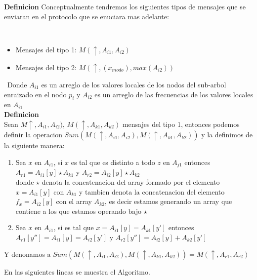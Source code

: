 \documentclass[11pt]{article}
\begin{document}
\textbf{Definicion}
Conceptualmente tendremos los siguientes tipos de mensajes que se enviaran en el protocolo que se enuciara
mas adelante:

\
\begin{itemize}
    \item Mensajes del tipo 1: $M(\uparrow, A_{i1},A_{i2}) $
    \item Mensajes del tipo 2: $ M(\uparrow,(x_{modo}), max(A_{i2}))$
\end{itemize}
\
Donde $A_{i1}$ es un arreglo de los valores locales de los nodos del sub-arbol enraizado
en el nodo $p_{i}$ y $A_{i2}$ es un arreglo de las frecuencias de los valores locales en $A_{i1}$
\\

\textbf{Definicion}\\
Sean $M\uparrow, A_{i1}, A_{i2})$, $M(\uparrow, A_{k1}, A_{k2})$ mensajes del tipo 1, entonces podemos definir la operacion $Sum(M(\uparrow, A_{i1}, A_{i2}), M(\uparrow, A_{k1}, A_{k2}))$ y la definimos
de la siguiente manera:\\
\begin{enumerate}
    \item Sea $x$ en $A_{i1}$, si $x$ es tal que es distinto a todo $z$ en $A_{j1}$
     entonces \\ $A_{r1} = A_{i1}[y] \star A_{k1}$ y $A_{r2} = A_{i2}[y] \star A_{k2}$ \\
     donde $\star$ denota la concatenacion del array formado por el elemento  $x = A_{i1}[y]$ con $A_{k1}$ y tambien denota
     la concatenacion del elemento $f_{x} = A_{i2}[y]$ con el array $A_{k2}$, es decir estamos generando un array
     que contiene a los que estamos operando bajo $\star$
    \item Sea $x$ en $A_{i1}$, si es tal que $x = A_{i1}[y] = A_{k1}[y']$ entonces $A_{r1}[y''] = A_{i1}[y] = A_{i2}[y']$  y
    $A_{r2}[y''] = A_{i2}[y] + A_{k2}[y']$
\end{enumerate}

Y denonamos a $Sum(M(\uparrow,A_{i1}, A_{i2}), M(\uparrow, A_{k1}, A_{k2})) = M(\uparrow, A_{r1}, A_{r2})$

\newpage

En las siguientes lineas se muestra el Algoritmo.
\end{document}
